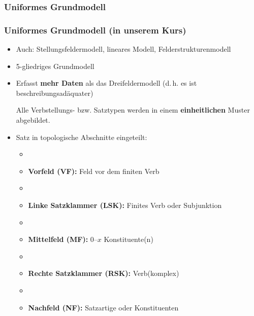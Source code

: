 \subsubsection{Uniformes Grundmodell}



\begin{frame}
\frametitle{Uniformes Grundmodell (in unserem Kurs)}

\begin{itemize}
	\item Auch: Stellungsfeldermodell,  lineares Modell, Felderstrukturenmodell 
	\item 5-gliedriges Grundmodell
	\item Erfasst \textbf{mehr Daten} als das Dreifeldermodell (d.\,h. es ist beschreibungsadäquater) 
	
	\ras Alle Verbstellungs- bzw. Satztypen werden in einem \textbf{einheitlichen} Muster abgebildet.
\end{itemize}

\end{frame}

\begin{frame}

\begin{itemize}
	\item Satz in topologische Abschnitte eingeteilt:
	\begin{itemize}
		\item []
		\item \textbf{Vorfeld (VF):} Feld vor dem finiten Verb
		\item[]
		\item \textbf{Linke Satzklammer (LSK):} Finites Verb oder Subjunktion
		\item[]
		\item \textbf{Mittelfeld (MF):} 0--$x$ Konstituente(n)
		\item[]		
		\item \textbf{Rechte Satzklammer (RSK):} Verb(komplex)
		\item[]		
		\item \textbf{Nachfeld (NF):} Satzartige oder  Konstituenten
	\end{itemize}
\pause
\end{itemize}

\begin{table}
\centering
{}
\end{table}
	
 \end{frame}


